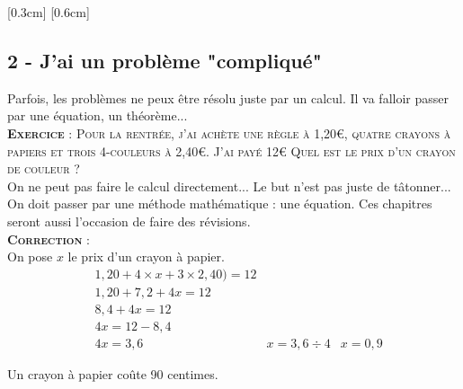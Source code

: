 \documentclass[11pt]{article}
\begin{document}
\begin{center}
\reversemarginpar\marginnote{$\Box \Box$}
\reversemarginpar\marginnote{$\Box \Box$}[0.3cm]
\reversemarginpar\marginnote{$\Box \Box$}[0.6cm]
\end{center}


\subsection*{2 - J'ai un problème "compliqué"}

Parfois, les problèmes ne peux être résolu juste par un calcul. Il va falloir passer par une équation, un théorème... \\

\textsc{\textbf{Exercice} : Pour la rentrée, j'ai achète une règle à 1,20€, quatre crayons à papiers et trois 4-couleurs à 2,40€. J'ai payé 12€} \newline
\textsc{Quel est le prix d'un crayon de couleur ?}\\

On ne peut pas faire le calcul directement... Le but n'est pas juste de tâtonner... On doit passer par une méthode mathématique : une équation. Ces chapitres seront aussi l'occasion de faire des révisions. \\

\textsc{\textbf{Correction} :}\\

On pose $x$ le prix d'un crayon à papier.
\begin{align*}
& 1,20 + 4 \times x + 3 \times 2,40) = 12 \\
& 1,20 + 7,2 + 4x = 12 \\
& 8,4 + 4x = 12 \\
& 4x = 12 - 8,4\\
& 4x = 3,6
& x = 3,6 \div 4
& x = 0,9
\end{align*}

Un crayon à papier coûte 90 centimes.

\begin{center}
\end{center}
\end{document}
